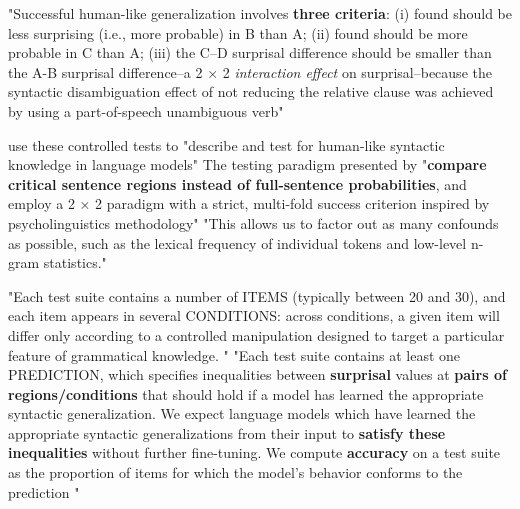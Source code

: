 "Successful human-like generalization involves \textbf{three criteria}: 
(i) found should be less surprising
(i.e., more probable) in B than A; 
(ii) found should be more probable in C than A; 
(iii) the C–D surprisal difference should be smaller than the A-B surprisal difference--a 2 × 2 \textit{interaction effect} on surprisal--because the syntactic disambiguation effect of not reducing the relative clause was achieved by using a part-of-speech unambiguous verb"\citep{hu2020systematic}

\citet{hu2020systematic} use these controlled tests to "describe and test for human-like syntactic knowledge in language models"
The testing paradigm presented  by \citet{hu2020systematic} "\textbf{compare critical sentence regions instead of full-sentence probabilities}, and employ a 2 × 2 paradigm with a strict, multi-fold success criterion inspired by psycholinguistics methodology"  \citep{hu2020systematic}
"This allows us to factor out as many confounds as possible, such as the lexical frequency of individual tokens and low-level n-gram statistics."  \citep{hu2020systematic}

"Each test suite contains a number of ITEMS (typically between 20 and 30), and each item appears in several CONDITIONS: across conditions, a given item will differ only according to a controlled manipulation designed to target a particular feature of grammatical knowledge. " \citep{hu2020systematic}
"Each test suite contains at least one PREDICTION, which specifies inequalities between \textbf{surprisal} values at \textbf{pairs of regions/conditions} that should hold if a model has learned the appropriate syntactic generalization. We expect language models which have learned the appropriate syntactic generalizations from their input to \textbf{satisfy these inequalities} without further fine-tuning. We compute \textbf{accuracy} on a test suite as
the proportion of items for which the model’s behavior conforms to the prediction "  \citep{hu2020systematic}

